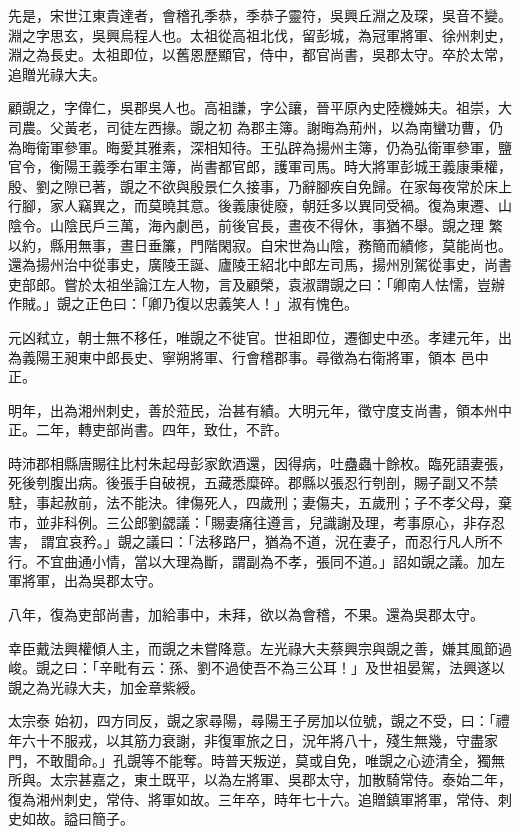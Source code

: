 \begin{pinyinscope}
 先是，宋世江東貴達者，會稽孔季恭，季恭子靈符，吳興丘淵之及琛，吳音不變。淵之字思玄，吳興烏程人也。太祖從高祖北伐，留彭城，為冠軍將軍、徐州刺史，淵之為長史。太祖即位，以舊恩歷顯官，侍中，都官尚書，吳郡太守。卒於太常，追贈光祿大夫。



 顧覬之，字偉仁，吳郡吳人也。高祖謙，字公讓，晉平原內史陸機姊夫。祖崇，大司農。父黃老，司徒左西掾。覬之初
 為郡主簿。謝晦為荊州，以為南蠻功曹，仍為晦衛軍參軍。晦愛其雅素，深相知待。王弘辟為揚州主簿，仍為弘衛軍參軍，鹽官令，衡陽王義季右軍主簿，尚書都官郎，護軍司馬。時大將軍彭城王義康秉權，殷、劉之隙已著，覬之不欲與殷景仁久接事，乃辭腳疾自免歸。在家每夜常於床上行腳，家人竊異之，而莫曉其意。後義康徙廢，朝廷多以異同受禍。復為東遷、山陰令。山陰民戶三萬，海內劇邑，前後官長，晝夜不得休，事猶不舉。覬之理
 繁以約，縣用無事，晝日垂簾，門階閑寂。自宋世為山陰，務簡而績修，莫能尚也。還為揚州治中從事史，廣陵王誕、廬陵王紹北中郎左司馬，揚州別駕從事史，尚書吏部郎。嘗於太祖坐論江左人物，言及顧榮，袁淑謂覬之曰：「卿南人怯懦，豈辦作賊。」覬之正色曰：「卿乃復以忠義笑人！」淑有愧色。



 元凶弒立，朝士無不移任，唯覬之不徙官。世祖即位，遷御史中丞。孝建元年，出為義陽王昶東中郎長史、寧朔將軍、行會稽郡事。尋徵為右衛將軍，領本
 邑中正。



 明年，出為湘州刺史，善於蒞民，治甚有績。大明元年，徵守度支尚書，領本州中正。二年，轉吏部尚書。四年，致仕，不許。



 時沛郡相縣唐賜往比村朱起母彭家飲酒還，因得病，吐蠱蟲十餘枚。臨死語妻張，死後刳腹出病。後張手自破視，五藏悉糜碎。郡縣以張忍行刳剖，賜子副又不禁駐，事起赦前，法不能決。律傷死人，四歲刑；妻傷夫，五歲刑；子不孝父母，棄市，並非科例。三公郎劉勰議：「賜妻痛往遵言，兒識謝及理，考事原心，非存忍害，
 謂宜哀矜。」覬之議曰：「法移路尸，猶為不道，況在妻子，而忍行凡人所不行。不宜曲通小情，當以大理為斷，謂副為不孝，張同不道。」詔如覬之議。加左軍將軍，出為吳郡太守。



 八年，復為吏部尚書，加給事中，未拜，欲以為會稽，不果。還為吳郡太守。



 幸臣戴法興權傾人主，而覬之未嘗降意。左光祿大夫蔡興宗與覬之善，嫌其風節過峻。覬之曰：「辛毗有云：孫、劉不過使吾不為三公耳！」及世祖晏駕，法興遂以覬之為光祿大夫，加金章紫綬。



 太宗泰
 始初，四方同反，覬之家尋陽，尋陽王子房加以位號，覬之不受，曰：「禮年六十不服戎，以其筋力衰謝，非復軍旅之日，況年將八十，殘生無幾，守盡家門，不敢聞命。」孔覬等不能奪。時普天叛逆，莫或自免，唯覬之心迹清全，獨無所與。太宗甚嘉之，東土既平，以為左將軍、吳郡太守，加散騎常侍。泰始二年，復為湘州刺史，常侍、將軍如故。三年卒，時年七十六。追贈鎮軍將軍，常侍、刺史如故。謚曰簡子。




\end{pinyinscope}
